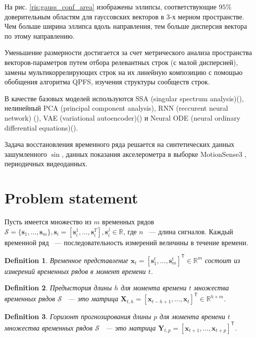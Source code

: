 \documentclass[12pt, twoside]{article}
\newtheorem{definition}{Definition}
\begin{document}
На рис. \ref{ris:gauss_conf_area} изображены эллипсы, соответствующие $95\%$ доверительным областям для гауссовских векторов в 3-х мерном пространстве. Чем больше ширина эллипса вдоль направления, тем больше дисперсия вектора по этому направлению.


Уменьшение размерности достигается за счет метрического анализа пространства векторов-параметров путем отбора релевантных строк (с малой дисперсией), замены мультикоррелирующих строк на их линейную композицию с помощью обобщения алгоритма QPFS, изучения структуры сообществ строк.

В качестве базовых моделей используются SSA (singular spectrum analysis)(\citep{golyandina2001analysis}), нелинейный PCA (principal component analysis), RNN (reccurent neural network) (\citep{bronstein2021geometric}), VAE (variational autoencoder)(\citep{kingma2019introduction}) и Neural ODE (neural ordinary differential equations)(\citep{chen2018neural}).

Задача восстановления временного ряда решается на синтетических данных зашумленного $\sin$, данных показания акселерометра в выборке MotionSense3 \citep{malekzadeh2018protecting}, периодичных видеоданных. 

\section{Problem statement}
Пусть имеется множество из $m$ временных рядов $\mathcal{S}=\{\mathbf{s}_1, \dots, \mathbf{s}_{m}\}, \mathbf{s}_i = [\mathbf{s}_i^1, \dots, \mathbf{s}_i^T], \mathbf{s}_i^j \in \mathbb{R}$, где $n$ ~--- длина сигналов. Каждый временной ряд ~--- последовательность измерений величины в течение времени.

\begin{definition}
Временное представление $\mathbf{x}_t = [\mathbf{s}_1^t, \dots, \mathbf{s}_m^t]^{\mathsf{T}} \in \mathbb{R}^m$ состоит из измерений временных рядов в момент времени $t$.
\end{definition}

\begin{definition}
Предыстория длины $h$ для момента времени $t$ множества временных рядов $\mathcal{S}$ ~--- это матрица $\mathbf{X}_{t,h} = [\mathbf{x}_{t-h+1}, \dots, \mathbf{x}_{t}]^{\mathsf{T}} \in \mathbb{R}^{h \times m}$.
\end{definition}

\begin{definition}
Горизонт прогнозирования длины $p$ для момента времени $t$ множества временных рядов $\mathcal{S}$ ~--- это матрица $\mathbf{Y}_{t, p} = [\mathbf{x}_{t+1}, \dots, \mathbf{x}_{t+p}]^{\mathsf{T}}$.
\end{definition}
\end{document}
